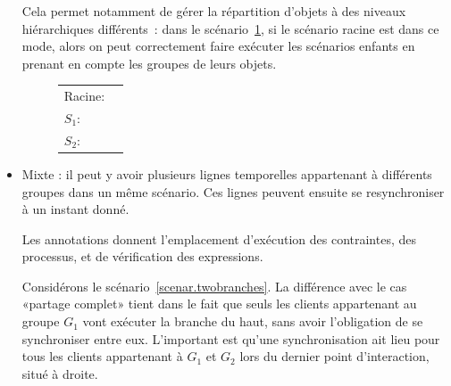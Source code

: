 \documentclass{article}
\newcommand\trigger{point d'interaction\xspace}
\begin{document}
\begin{itemize}
    Cela permet notamment de gérer la répartition d'objets à des niveaux hiérarchiques différents~: dans le scénario~\ref{scenar.hierarchy}, si le scénario racine est dans ce mode, alors on peut correctement faire exécuter les scénarios enfants en prenant en compte les groupes de leurs objets. 
    
    \begin{figure}[h]
        \centering
        \begin{tabular}{L{3.5em}R{0.3\textwidth}}
            Racine: & \begin{tikzpicture}
            
            \end{tikzpicture} \\
            $S_1$: & \begin{tikzpicture}[scale=0.4, every node/.style={scale=0.6}]
            
            \end{tikzpicture} \\
            $S_2$: & \begin{tikzpicture}[scale=0.6, every node/.style={scale=0.6}]
            
            \end{tikzpicture} \\
        \end{tabular}
        \label{scenar.hierarchy}
    \end{figure}
    
    \item Mixte : il peut y avoir plusieurs lignes temporelles appartenant à différents groupes dans un même scénario. 
    Ces lignes peuvent ensuite se resynchroniser à un instant donné. 
    
    
    Les annotations donnent l'emplacement d'exécution des contraintes, des processus, et de vérification des expressions. 
    
    Considérons le scénario~\ref{scenar.twobranches}. 
    La différence avec le cas «partage complet» tient dans le fait que seuls les clients appartenant au groupe $G_1$ vont exécuter la branche du haut, sans avoir l'obligation de se synchroniser entre eux. 
    L'important est qu'une synchronisation ait lieu pour tous les clients appartenant à $G_1$ et $G_2$ lors du dernier \trigger, situé à droite.
    

\end{itemize}
\end{document}

